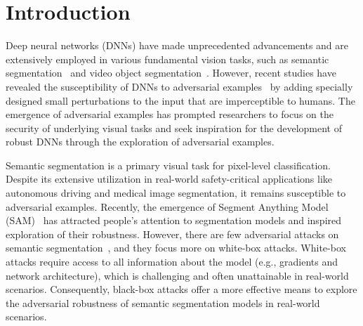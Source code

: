 \documentclass[10pt,twocolumn,letterpaper]{article}
\begin{document}
\section{Introduction}
\label{sec:intro}

Deep neural networks (DNNs) have made unprecedented advancements and are extensively employed in various fundamental vision tasks, such as semantic segmentation~\cite{fcn,pspnet,deeplabv3} and video object segmentation~\cite{hong2021adaptive,hong2022lvos,guo2022adaptive}. However, recent studies have revealed the susceptibility of DNNs to adversarial examples~\cite{fgsm,chen2022towards,chen2022shape,chen2023contentbased} by adding specially designed small perturbations to the input that are imperceptible to humans. 
The emergence of adversarial examples has prompted researchers to focus on the security of underlying visual tasks and seek inspiration for the development of robust DNNs through the exploration of adversarial examples.

Semantic segmentation is a primary visual task for pixel-level classification. Despite its extensive utilization in real-world safety-critical applications like autonomous driving and medical image segmentation, it remains susceptible to adversarial examples. Recently, the emergence of Segment Anything Model (SAM)~\cite{sam} has attracted people's attention to segmentation models and inspired exploration of their robustness. 
However, there are few adversarial attacks on semantic segmentation~\cite{segpgd}, and they focus more on white-box attacks. White-box attacks require access to all information about the model (e.g., gradients and network architecture), which is challenging and often unattainable in real-world scenarios. 
Consequently, black-box attacks offer a more effective means to explore the adversarial robustness of semantic segmentation models in real-world scenarios.
\end{document}
